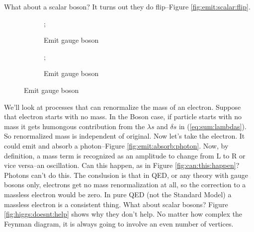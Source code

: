 \documentclass[]{article}
\begin{document}
What about a scalar boson? It turns out they do flip--Figure \ref{fig:emit:scalar:flip}.
\begin{figure}[H]
	\begin{center}
		\caption{Emission of a scalar boson does flip helicity}\label{fig:emit:scalar:flip}
		\begin{subfigure}[t]{0.3\textwidth}
			\caption{Emit gauge boson}
			;
		\end{subfigure}
		\begin{subfigure}[t]{0.3\textwidth}
			\caption{Emit gauge boson}
			;
		\end{subfigure}
	\end{center}
\end{figure}

We'll look at processes that can renormalize the mass of an electron. Suppose that electron starts with no mass. In the Boson case, if particle starts with no mass it gets humongous contribution from the $\lambda s$ and $\delta s$ in (\ref{eq:sum:lambdas}). So renormalized mass is independent of original. Now let's take the electron. It could emit and absorb a photon--Figure \ref{fig:emit:absorb:photon}. Now, by definition, a mass term is recognized as an amplitude to change from L to R or vice versa--an oscillation. Can this happen, as in Figure \ref{fig:can:this:happen}? Photons can't do this. The conslusion is that in QED, or any theory with gauge bosons only, electrons get no mass renormalization at all, so the correction to a massless electron would be zero. In pure QED (not the Standard Model) a massless electron is a consistent thing. What about scalar bosons? Figure \ref{fig:higgs:doesnt:help} shows why they don't help. No matter how complex the Feynman diagram, it is always going to involve an even number of vertices.
\end{document}
